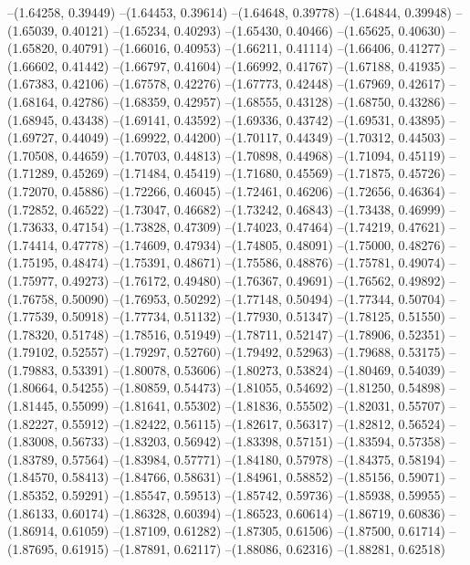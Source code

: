 --(1.64258, 0.39449)
--(1.64453, 0.39614)
--(1.64648, 0.39778)
--(1.64844, 0.39948)
--(1.65039, 0.40121)
--(1.65234, 0.40293)
--(1.65430, 0.40466)
--(1.65625, 0.40630)
--(1.65820, 0.40791)
--(1.66016, 0.40953)
--(1.66211, 0.41114)
--(1.66406, 0.41277)
--(1.66602, 0.41442)
--(1.66797, 0.41604)
--(1.66992, 0.41767)
--(1.67188, 0.41935)
--(1.67383, 0.42106)
--(1.67578, 0.42276)
--(1.67773, 0.42448)
--(1.67969, 0.42617)
--(1.68164, 0.42786)
--(1.68359, 0.42957)
--(1.68555, 0.43128)
--(1.68750, 0.43286)
--(1.68945, 0.43438)
--(1.69141, 0.43592)
--(1.69336, 0.43742)
--(1.69531, 0.43895)
--(1.69727, 0.44049)
--(1.69922, 0.44200)
--(1.70117, 0.44349)
--(1.70312, 0.44503)
--(1.70508, 0.44659)
--(1.70703, 0.44813)
--(1.70898, 0.44968)
--(1.71094, 0.45119)
--(1.71289, 0.45269)
--(1.71484, 0.45419)
--(1.71680, 0.45569)
--(1.71875, 0.45726)
--(1.72070, 0.45886)
--(1.72266, 0.46045)
--(1.72461, 0.46206)
--(1.72656, 0.46364)
--(1.72852, 0.46522)
--(1.73047, 0.46682)
--(1.73242, 0.46843)
--(1.73438, 0.46999)
--(1.73633, 0.47154)
--(1.73828, 0.47309)
--(1.74023, 0.47464)
--(1.74219, 0.47621)
--(1.74414, 0.47778)
--(1.74609, 0.47934)
--(1.74805, 0.48091)
--(1.75000, 0.48276)
--(1.75195, 0.48474)
--(1.75391, 0.48671)
--(1.75586, 0.48876)
--(1.75781, 0.49074)
--(1.75977, 0.49273)
--(1.76172, 0.49480)
--(1.76367, 0.49691)
--(1.76562, 0.49892)
--(1.76758, 0.50090)
--(1.76953, 0.50292)
--(1.77148, 0.50494)
--(1.77344, 0.50704)
--(1.77539, 0.50918)
--(1.77734, 0.51132)
--(1.77930, 0.51347)
--(1.78125, 0.51550)
--(1.78320, 0.51748)
--(1.78516, 0.51949)
--(1.78711, 0.52147)
--(1.78906, 0.52351)
--(1.79102, 0.52557)
--(1.79297, 0.52760)
--(1.79492, 0.52963)
--(1.79688, 0.53175)
--(1.79883, 0.53391)
--(1.80078, 0.53606)
--(1.80273, 0.53824)
--(1.80469, 0.54039)
--(1.80664, 0.54255)
--(1.80859, 0.54473)
--(1.81055, 0.54692)
--(1.81250, 0.54898)
--(1.81445, 0.55099)
--(1.81641, 0.55302)
--(1.81836, 0.55502)
--(1.82031, 0.55707)
--(1.82227, 0.55912)
--(1.82422, 0.56115)
--(1.82617, 0.56317)
--(1.82812, 0.56524)
--(1.83008, 0.56733)
--(1.83203, 0.56942)
--(1.83398, 0.57151)
--(1.83594, 0.57358)
--(1.83789, 0.57564)
--(1.83984, 0.57771)
--(1.84180, 0.57978)
--(1.84375, 0.58194)
--(1.84570, 0.58413)
--(1.84766, 0.58631)
--(1.84961, 0.58852)
--(1.85156, 0.59071)
--(1.85352, 0.59291)
--(1.85547, 0.59513)
--(1.85742, 0.59736)
--(1.85938, 0.59955)
--(1.86133, 0.60174)
--(1.86328, 0.60394)
--(1.86523, 0.60614)
--(1.86719, 0.60836)
--(1.86914, 0.61059)
--(1.87109, 0.61282)
--(1.87305, 0.61506)
--(1.87500, 0.61714)
--(1.87695, 0.61915)
--(1.87891, 0.62117)
--(1.88086, 0.62316)
--(1.88281, 0.62518)
